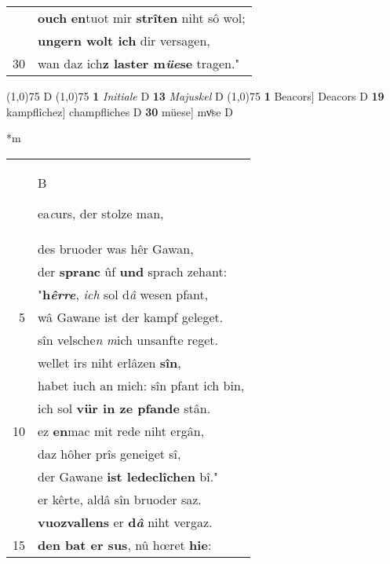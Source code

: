\documentclass[8pt,a4paper,notitlepage]{article}
\begin{document}
\begin{table}[ht]
\begin{minipage}[t]{0.5\linewidth}
\begin{tabular}{rl}
 & \textbf{ouch} \textbf{en}tuot mir \textbf{strîten} niht sô wol;\\ 
 & \textbf{ungern wolt ich} dir versagen,\\ 
30 & wan daz ich\textbf{z laster m\textit{üe}se} tragen."\\ 
\end{tabular}
\scriptsize
\line(1,0){75} \newline
D \newline
\line(1,0){75} \newline
\textbf{1} \textit{Initiale} D  \textbf{13} \textit{Majuskel} D  \newline
\line(1,0){75} \newline
\textbf{1} Beacors] Deacors D \textbf{19} kampflîchez] champfliches D \textbf{30} müese] mvͦse D \newline
\end{minipage}
\hspace{0.5cm}
\begin{minipage}[t]{0.5\linewidth}
\small
\begin{center}*m
\end{center}
\begin{tabular}{rl}
 & \begin{large}B\end{large}ea\textit{c}urs, der stolze man,\\ 
 & des bruoder was hêr Gawan,\\ 
 & der \textbf{spranc} ûf \textbf{und} sprach zehant:\\ 
 & "\textbf{h\textit{êrre}}, \textit{ich} sol d\textit{â} wesen pfant,\\ 
5 & wâ Gawane ist der kampf geleget.\\ 
 & sîn velsche\textit{n} \textit{m}ich unsanfte reget.\\ 
 & wellet irs niht erlâzen \textbf{sîn},\\ 
 & habet iuch an mich: sîn pfant ich bin,\\ 
 & ich sol \textbf{vür in ze pfande} stân.\\ 
10 & ez \textbf{en}mac mit rede niht ergân,\\ 
 & daz hôher prîs geneiget sî,\\ 
 & der Gawane \textbf{ist ledeclîchen} bî."\\ 
 & er kêrte, aldâ sîn bruoder saz.\\ 
 & \textbf{vuozvallens} er \textbf{d\textit{â}} niht vergaz.\\ 
15 & \textbf{den bat er sus}, nû hœret \textbf{hie}:\\ 

\end{tabular}
\end{minipage}
\end{table}
\end{document}
